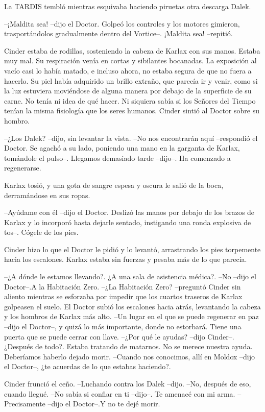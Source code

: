 La TARDIS tembló mientras esquivaba haciendo piruetas otra descarga Dalek. 

--¡Maldita sea! --dijo el Doctor. Golpeó los controles y los motores gimieron, trasportándolos gradualmente dentro del Vortice--. ¡Maldita sea! --repitió.

Cinder estaba de rodillas, sosteniendo la cabeza de Karlax con sus manos. Estaba muy mal. Su respiración venía en cortas y sibilantes bocanadas. La exposición al vacío casi lo había matado, e incluso ahora, no estaba segura de que no fuera a hacerlo. Su piel había adquirido un brillo extraño, que parecía ir y venir, como si la luz estuviera moviéndose de alguna manera por debajo de la superficie de su carne.
No tenía ni idea de qué hacer. Ni siquiera sabía si los Señores del Tiempo tenían la misma fisiología que los seres humanos.
Cinder sintió al Doctor sobre su hombro. 

--¿Los Dalek? --dijo, sin levantar la vista.
--No nos encontrarán aquí --respondió el Doctor. Se agachó a su lado, poniendo una mano en la garganta de Karlax, tomándole el pulso--. Llegamos demasiado tarde --dijo--. Ha comenzado a regenerarse.

Karlax tosió, y una gota de sangre espesa y oscura le salió de la boca, derramándose en sus ropas.

--Ayúdame con él --dijo el Doctor. Deslizó las manos por debajo de los brazos de Karlax y 
lo incorporó hasta dejarle sentado, instigando una ronda explosiva de tos--. Cógele de los pies.

Cinder hizo lo que el Doctor le pidió y lo levantó, arrastrando los pies torpemente hacia los escalones. Karlax estaba sin fuerzas y pesaba más de lo que parecía. 

--¿A dónde le estamos llevando?. ¿A una sala de asistencia médica?.
--No --dijo el Doctor--.A la Habitación Zero.
--¿La Habitación Zero? --preguntó Cinder sin aliento mientras se esforzaba por impedir que los cuartos traseros de Karlax golpeasen el suelo. El Doctor subió los escalones hacia atrás, levantando la cabeza y los hombros de Karlax más alto.
--Un lugar en el que se puede regenerar en paz --dijo el Doctor--, y quizá lo más importante, donde no estorbará. Tiene una puerta que se puede cerrar con llave.
--¿Por qué le ayudas? --dijo Cinder--. ¿Después de todo?. Estaba tratando de matarnos. No se merece nuestra ayuda. Deberíamos haberlo dejado morir.
--Cuando nos conocimos, allí en Moldox --dijo el Doctor--, ¿te acuerdas de lo que estabas haciendo?.

Cinder frunció el ceño. 
--Luchando contra los Dalek --dijo.
--No, después de eso, cuando llegué.
--No sabía si confiar en ti --dijo--. Te amenacé con mi arma.
--Precisamente --dijo el Doctor--.Y no te dejé morir.

